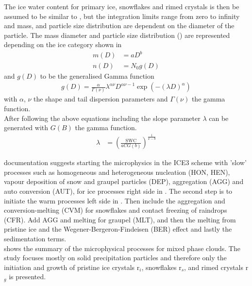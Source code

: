 The ice water content for primary ice, snowflakes and rimed crystals is then be assumed to be similar to , but the integration limits range from zero to infinity and mass, and particle size distribution are dependent on the diameter of the particle. The mass diameter and particle size distribution () are represented depending on the ice category shown in 
\begin{align}
	m(D) & = aD^b 	\label{eq:mass_diameter} \\
	n(D) & = N_0 g(D)	\label{eq:PSD_MEPS}
\end{align}
and $g(D)$ to be the generalised Gamma function 
\begin{align}
	g(D) = \frac{\alpha}{\Gamma(\nu)} \lambda^{\alpha \nu} D^{\alpha \nu -1} \exp\left( -(\lambda D)^\alpha \right)
\end{align}
with $\alpha$, $\nu$ the shape and tail dispersion parameters and $\Gamma(\nu)$ the gamma function. 
\\
After following the above equations including  the slope parameter $\lambda$ can be generated with $G(B)$ the gamma function.
\begin{align}
	\lambda & = \left( \frac{\text{SWC}}{aCG(b)}\right)^{\frac{1}{x-b}}
\end{align}
%

%

\newline
\citet{meteo_france_meso-nh_2009} documentation suggests starting the microphysics in the ICE3 scheme with 'slow' processes such as homogeneous and heterogeneous nucleation (HON, HEN), vapour deposition of snow and graupel particles (DEP), aggregation (AGG) and auto conversion (AUT), for ice processes right side in . The second step is to initiate the warm processes left side in . Then include the aggregation and conversion-melting (CVM) for snowflakes and contact freezing of raindrops (CFR). Add AGG and melting for graupel (MLT), and then the melting from pristine ice  and the Wegener-Bergeron-Findeisen (BER) effect and lastly the sedimentation terms.  \\
 shows the summary of the microphysical processes for mixed phase clouds. The study focuses mostly on solid precipitation particles and therefore only the initiation and growth of pristine ice crystals r$_i$, snowflakes r$_s$, and rimed crystals r$_g$ is presented. 
